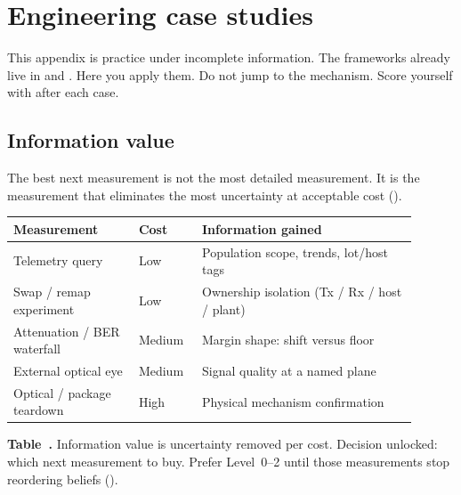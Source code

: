 \chapter{Engineering case studies}
\label{app:case-studies}

This appendix is practice under incomplete information. The frameworks already
live in 
and . Here you apply them. Do not jump to the mechanism.
Score yourself with  after each case.

\section{Information value}
\label{sec:case-info-value}

The best next measurement is not the most detailed measurement. It is the
measurement that eliminates the most uncertainty at acceptable cost
().

\begin{table}[ht]
\label{tab:case-info-value}%
\centering
\setlength{\tabcolsep}{4pt}%
\footnotesize
\renewcommand{\arraystretch}{1.2}%
\begin{tabular}{@{}p{0.28\linewidth}p{0.14\linewidth}p{0.48\linewidth}@{}}
\toprule
Measurement & Cost & Information gained \\
\midrule
Telemetry query & Low & Population scope, trends, lot/host tags \\
\addlinespace[0.6em]
Swap / remap experiment & Low & Ownership isolation (Tx / Rx / host / plant) \\
\addlinespace[0.6em]
Attenuation / BER waterfall & Medium & Margin shape: shift versus floor \\
\addlinespace[0.6em]
External optical eye & Medium & Signal quality at a named plane \\
\addlinespace[0.6em]
Optical / package teardown & High & Physical mechanism confirmation \\
\bottomrule
\end{tabular}
\par\medskip
{\raggedright\footnotesize\textbf{Table~\thetable.} Information value is
uncertainty removed per cost. Decision unlocked: which next measurement to buy.
Prefer Level~0--2 until those measurements stop reordering beliefs
().\par}
\end{table}

